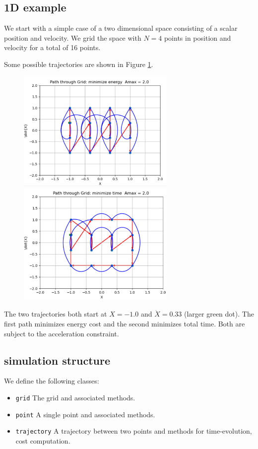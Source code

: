 \documentclass[letterpaper]{article}
\begin{document}
\subsection{1D example}
We start with a simple case of a two dimensional space consisting of a scalar position and velocity.  We grid the
space with $N=4$ points in position and velocity for a total of 16 points.

Some possible trajectories are shown in Figure \ref{handsolutions1D}.

\begin{figure}\centering
  \includegraphics[width=3.0in]{handTraj01.png}
  \includegraphics[width=3.0in]{handTraj02.png}
  \caption{}\label{handsolutions1D}
\end{figure}

The two trajectories both start at $X=-1.0$ and $\dot{X}=0.33$
(larger green dot).  The first path minimizes energy cost
and the second minimizes total time.  Both are subject to the
acceleration constraint.

\subsection{simulation structure}
We define the following classes:
\begin{itemize}
  \item {\tt grid}   The grid and associated methods.
  \item {\tt point}  A single point and associated methods.
  \item {\tt trajectory} A trajectory between two points and methods for time-evolution, cost computation.
\end{itemize}
\end{document}
